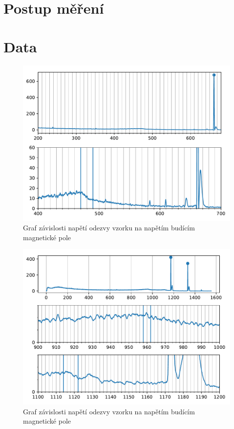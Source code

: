 \documentclass{article}
\begin{document}
\section{Postup měření}
\section{Data}
\begin{figure}[h]
  \hspace*{-1em}
  \includegraphics[scale=0.8]{figs/Cs137.pdf}
  \caption{Graf závislosti napětí odezvy vzorku na napětím budícím magnetické pole}
\end{figure}
\begin{figure}[h]
  \hspace*{-1em}
  \includegraphics[scale=0.8]{figs/Co60.pdf}
  \caption{Graf závislosti napětí odezvy vzorku na napětím budícím magnetické pole}
\end{figure}
\end{document}
